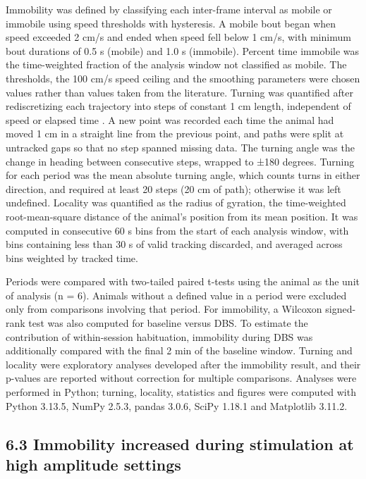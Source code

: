 Immobility was defined by classifying each inter-frame interval as mobile or immobile using speed thresholds with hysteresis. A mobile bout began when speed exceeded 2 cm/s and ended when speed fell below 1 cm/s, with minimum bout durations of 0.5 s (mobile) and 1.0 s (immobile). Percent time immobile was the time-weighted fraction of the analysis window not classified as mobile. The thresholds, the 100 cm/s speed ceiling and the smoothing parameters were chosen values rather than values taken from the literature. Turning was quantified after rediscretizing each trajectory into steps of constant 1 cm length, independent of speed or elapsed time \citep{bovet1988}. A new point was recorded each time the animal had moved 1 cm in a straight line from the previous point, and paths were split at untracked gaps so that no step spanned missing data. The turning angle was the change in heading between consecutive steps, wrapped to ±180 degrees. Turning for each period was the mean absolute turning angle, which counts turns in either direction, and required at least 20 steps (20 cm of path); otherwise it was left undefined. Locality was quantified as the radius of gyration, the time-weighted root-mean-square distance of the animal's position from its mean position. It was computed in consecutive 60 s bins from the start of each analysis window, with bins containing less than 30 s of valid tracking discarded, and averaged across bins weighted by tracked time.

Periods were compared with two-tailed paired t-tests using the animal as the unit of analysis (n = 6). Animals without a defined value in a period were excluded only from comparisons involving that period. For immobility, a Wilcoxon signed-rank test was also computed for baseline versus DBS. To estimate the contribution of within-session habituation, immobility during DBS was additionally compared with the final 2 min of the baseline window. Turning and locality were exploratory analyses developed after the immobility result, and their p-values are reported without correction for multiple comparisons. Analyses were performed in Python; turning, locality, statistics and figures were computed with Python 3.13.5, NumPy 2.5.3, pandas 3.0.6, SciPy 1.18.1 and Matplotlib 3.11.2.

\subsection{6.3 Immobility increased during stimulation at high amplitude settings}\label{immobility-increased-during-high-amplitude-stimulation}

